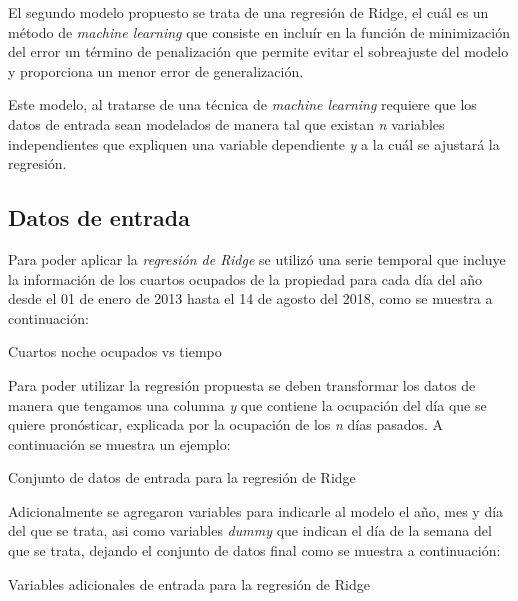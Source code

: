 El segundo modelo propuesto se trata de una regresión de Ridge, el cuál es un método de \emph{machine learning} que consiste en incluír en la función de minimización del error un término de penalización que permite evitar el sobreajuste del modelo y proporciona un menor error de generalización.

Este modelo, al tratarse de una técnica de \emph{machine learning} requiere que los datos de entrada sean modelados de manera tal que existan \emph{n} variables independientes que expliquen una variable dependiente \emph{y} a la cuál se ajustará la regresión.

\subsection*{Datos de entrada}

Para poder aplicar la \emph{regresión de Ridge} se utilizó una serie temporal que incluye la información de los cuartos ocupados de la propiedad para cada día del año desde el 01 de enero de 2013 hasta el 14 de agosto del 2018, como se muestra a continuación:

\begin{table}[H]
  \centering
  \par
  \caption{Cuartos noche ocupados vs tiempo}
\end{table}

Para poder utilizar la regresión propuesta se deben transformar los datos de manera que tengamos una columna \emph{y} que contiene la ocupación del día que se quiere pronósticar, explicada por la ocupación de los \emph{n} días pasados. A continuación se muestra un ejemplo:

\begin{table}[H]
  \centering
  \par
  \caption{Conjunto de datos de entrada para la regresión de Ridge}
\end{table}

Adicionalmente se agregaron variables para indicarle al modelo el año, mes y día del que se trata, asi como variables \emph{dummy} que indican el día de la semana del que se trata, dejando el conjunto de datos final como se muestra a continuación:

\begin{table}[H]
  \centering
  \par
  \caption{Variables adicionales de entrada para la regresión de Ridge}
\end{table}

